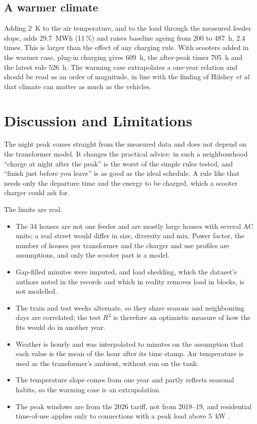 \documentclass[conference]{IEEEtran}
\begin{document}
\subsection{A warmer climate}
Adding 2~K to the air temperature, and to the load through the measured
feeder slope, adds 29.7~MWh (11\,\%) and raises baseline ageing from 200 to
487~h, 2.4 times. This is larger than the effect of any charging rule. With
scooters added in the warmer case, plug-in charging gives 609~h, the
after-peak timer 705~h and the latest rule 526~h. The warming case
extrapolates a one-year relation and should be read as an order of
magnitude, in line with the finding of Hilshey \emph{et al.}
\cite{hilshey2013} that climate can matter as much as the vehicles.

\section{Discussion and Limitations}
The night peak comes straight from the measured data and does not depend on
the transformer model. It changes the practical advice: in such a
neighbourhood ``charge at night after the peak'' is the worst of the simple
rules tested, and ``finish just before you leave'' is as good as the ideal
schedule. A rule like that needs only the departure time and the energy to be
charged, which a scooter charger could ask for.

The limits are real.
\begin{itemize}
\item The 34 houses are not one feeder and are mostly large houses with
several AC units; a real street would differ in size, diversity and mix.
Power factor, the number of houses per transformer and the charger and use
profiles are assumptions, and only the scooter part is a model.
\item Gap-filled minutes were imputed, and load shedding, which the dataset's
authors noted in the records \cite{nadeem2020} and which in reality removes
load in blocks, is not modelled.
\item The train and test weeks alternate, so they share seasons and
neighbouring days are correlated; the test $R^2$ is therefore an optimistic
measure of how the fits would do in another year.
\item Weather is hourly and was interpolated to minutes on the assumption
that each value is the mean of the hour after its time stamp. Air temperature
is used as the transformer's ambient, without sun on the tank.
\item The temperature slope comes from one year and partly reflects seasonal
habits, so the warming case is an extrapolation.
\item The peak windows are from the 2026 tariff, not from 2018--19, and
residential time-of-use applies only to connections with a peak load above
5~kW \cite{nepra2026}.
\end{itemize}
\end{document}
